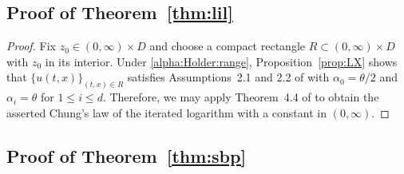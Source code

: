 \documentclass[reqno]{amsart}
\newcommand{\R}{\mathbb R}
\newcommand{\1}{\mathbf 1}
\numberwithin{equation}{section}
\newtheorem{lemma}[theorem]{Lemma}
\theoremstyle{definition}
\begin{document}
\subsection{Proof of Theorem~\ref{thm:lil}}

\begin{proof}
Fix \(z_0\in(0,\infty)\times D\) and choose a compact rectangle
\(R \subset (0,\infty) \times D\) with \(z_0\) in its interior. 
Under \eqref{alpha:Holder:range}, Proposition~\ref{prop:LX} shows that $\{u(t,x)\}_{(t,x) \in R}$ satisfies Assumptions~2.1 and 2.2 of 
\cite{LX23} with \(\alpha_0=\theta/2\) and
\(\alpha_i=\theta\) for \(1\le i\le d\).
Therefore, we may apply Theorem~4.4 of \cite{LX23} to obtain the asserted Chung's law of the iterated logarithm with a  constant in \((0,\infty)\). 
\end{proof}

\subsection{Proof of Theorem~\ref{thm:sbp}}


%
\end{document}
